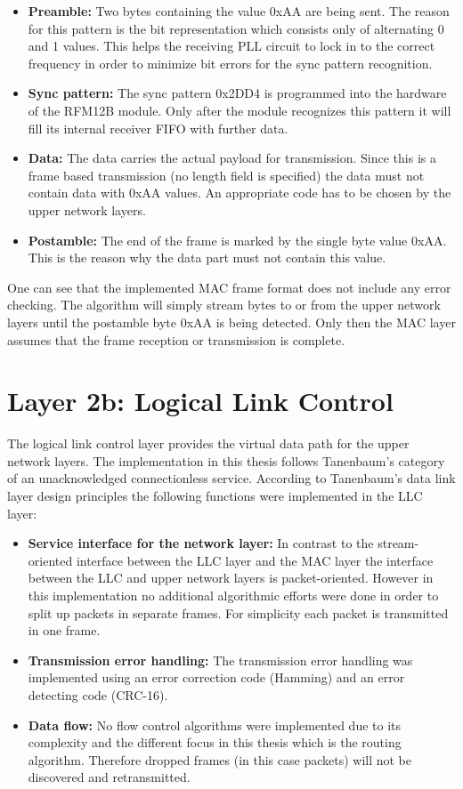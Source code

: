 \begin{itemize}
    \item \textbf{Preamble:} Two bytes containing the value 0xAA are being sent. The reason for this pattern is the bit representation which consists only of alternating 0 and 1 values. This helps the receiving PLL circuit to lock in to the correct frequency in order to minimize bit errors for the sync pattern recognition.
    \item \textbf{Sync pattern:} The sync pattern 0x2DD4 is programmed into the hardware of the RFM12B module. Only after the module recognizes this pattern it will fill its internal receiver FIFO with further data.
    \item \textbf{Data:} The data carries the actual payload for transmission. Since this is a frame based transmission (no length field is specified) the data must not contain data with 0xAA values. An appropriate code has to be chosen by the upper network layers.
    \item \textbf{Postamble:} The end of the frame is marked by the single byte value 0xAA. This is the reason why the data part must not contain this value.
\end{itemize}

One can see that the implemented MAC frame format does not include any error checking. The algorithm will simply stream bytes to or from the upper network layers until the postamble byte 0xAA is being detected. Only then the MAC layer assumes that the frame reception or transmission is complete.

\section{Layer 2b: Logical Link Control}%
The logical link control layer provides the virtual data path for the upper network layers. The implementation in this thesis follows Tanenbaum's \cite{tannenbaum} category of an unacknowledged connectionless service. According to Tanenbaum's data link layer design principles the following functions were implemented in the LLC layer:

\begin{itemize}
    \item \textbf{Service interface for the network layer:} In contrast to the stream-oriented interface between the LLC layer and the MAC layer the interface between the LLC and upper network layers is packet-oriented. However in this implementation no additional algorithmic efforts were done in order to split up packets in separate frames. For simplicity each packet is transmitted in one frame.
    \item \textbf{Transmission error handling:} The transmission error handling was implemented using an error correction code (Hamming) and an error detecting code (CRC-16).
    \item \textbf{Data flow:} No flow control algorithms were implemented due to its complexity and the different focus in this thesis which is the routing algorithm. Therefore dropped frames (in this case packets) will not be discovered and retransmitted.
\end{itemize}

